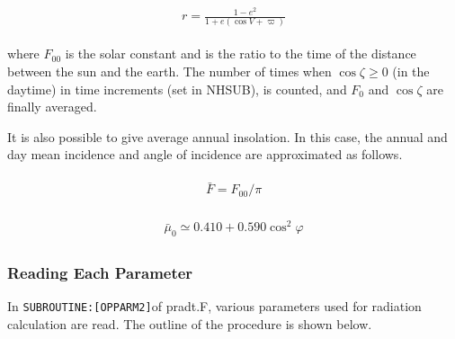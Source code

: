 \begin{eqnarray}
\begin{array}{c}
r=\frac{1-e^{2}}{1+e(\cos V+\varpi)}
\end{array}
\end{eqnarray}

where \(F_{00}\) is the solar constant and is the ratio to the time of the distance between the sun and the earth. The number of times when \(\cos \zeta \geq 0\) (in the daytime) in time increments
(set in NHSUB), is counted, and \(F_{0}\) and \(\cos \zeta\) are finally averaged.

It is also possible to give average annual insolation. In this case, the annual and day mean incidence and angle of incidence are approximated as follows.

\begin{eqnarray}
\begin{array}{c}
\bar{F}=F_{00} / \pi
\end{array}
\end{eqnarray}

\begin{eqnarray}
\begin{array}{c}
\bar{\mu}_{0} \simeq 0.410+0.590 \cos ^{2} \varphi
\end{array}
\end{eqnarray}

\hypertarget{reading-each-parameter}{%
\subsubsection{Reading Each Parameter}\label{reading-each-parameter}}

In \texttt{SUBROUTINE:{[}OPPARM2{]}}of pradt.F, various parameters used for radiation calculation are read. The outline of the procedure is shown below.

